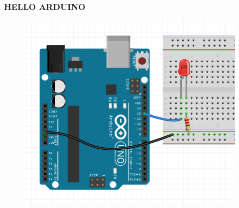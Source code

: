 \begin{frame}
	\frametitle{HELLO ARDUINO}
	\begin{figure}
   		\includegraphics[scale=.55]{assets/hello} 
	\end{figure}
\end{frame}




